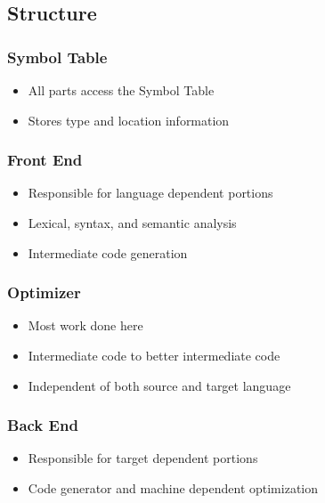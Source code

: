 \documentclass[usepdftitle=false,professionalfonts,compress ]{beamer}
\begin{document}
\subsection{Structure}

{
\begin{frame}\frametitle{Symbol Table}

	\begin{itemize}
	\item All parts access the Symbol Table
			\item Stores type and location information
				\end{itemize}

\end{frame}}




{
\begin{frame}\frametitle{Front End}

	\begin{itemize}
	\item Responsible for language dependent portions
			\item Lexical, syntax, and semantic analysis
			\item Intermediate code generation
				\end{itemize}

\end{frame}}





{
\begin{frame}\frametitle{Optimizer}

	\begin{itemize}
	\item Most work done here
			\item Intermediate code to better intermediate code
			\item Independent of both source and target language
				\end{itemize}

\end{frame}}





{
\begin{frame}\frametitle{Back End}

	\begin{itemize}
	\item Responsible for target dependent portions
			\item Code generator and machine dependent optimization
				\end{itemize}

\end{frame}}
\end{document}
